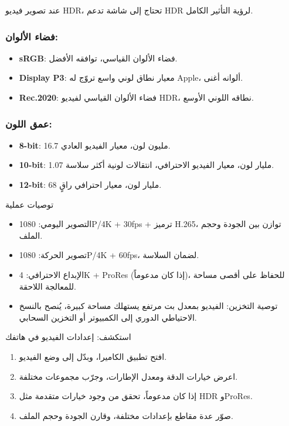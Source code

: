 عند تصوير فيديو HDR، تحتاج إلى شاشة تدعم HDR لرؤية التأثير الكامل.


\subsubsection*{فضاء الألوان:}

\begin{itemize}
  \item \textbf{sRGB}: فضاء الألوان القياسي، توافقه الأفضل.
  \item \textbf{Display P3}: معيار نطاق لوني واسع تروّج له Apple، ألوانه أغنى.
  \item \textbf{Rec.2020}: فضاء الألوان القياسي لفيديو HDR، نطاقه اللوني الأوسع.
\end{itemize}

\subsubsection*{عمق اللون:}

\begin{itemize}
  \item \textbf{8-bit}: 16.7 مليون لون، معيار الفيديو العادي.
  \item \textbf{10-bit}: 1.07 مليار لون، معيار الفيديو الاحترافي، انتقالات لونية أكثر سلاسة.
  \item \textbf{12-bit}: 68 مليار لون، معيار احترافي راقٍ.
\end{itemize}

\begin{tcbinfo}{توصيات عملية}
\begin{itemize}
  \item التصوير اليومي: 1080P/4K + 30fps + ترميز H.265، توازن بين الجودة وحجم الملف.
  \item تصوير الحركة: 1080P/4K + 60fps، لضمان السلاسة.
  \item الإبداع الاحترافي: 4K + ProRes (إذا كان مدعوماً)، للحفاظ على أقصى مساحة للمعالجة اللاحقة.
  \item توصية التخزين: الفيديو بمعدل بت مرتفع يستهلك مساحة كبيرة، يُنصح بالنسخ الاحتياطي الدوري إلى الكمبيوتر أو التخزين السحابي.
\end{itemize}

\end{tcbinfo}

\begin{tcbpractice}{استكشف: إعدادات الفيديو في هاتفك}
\begin{enumerate}
  \item افتح تطبيق الكاميرا، وبدّل إلى وضع الفيديو.
  \item اعرض خيارات الدقة ومعدل الإطارات، وجرّب مجموعات مختلفة.
  \item إذا كان مدعوماً، تحقق من وجود خيارات متقدمة مثل HDR وProRes.
  \item صوّر عدة مقاطع بإعدادات مختلفة، وقارن الجودة وحجم الملف.
\end{enumerate}

\end{tcbpractice}

